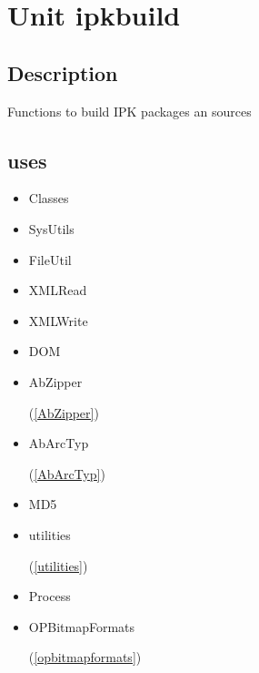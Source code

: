 \documentclass{report}
\begin{document}
\chapter{Unit ipkbuild}
\label{ipkbuild}
\section{Description}
Functions to build IPK packages an sources
\section{uses}
\begin{itemize}
\item \begin{ttfamily}Classes\end{ttfamily}\item \begin{ttfamily}SysUtils\end{ttfamily}\item \begin{ttfamily}FileUtil\end{ttfamily}\item \begin{ttfamily}XMLRead\end{ttfamily}\item \begin{ttfamily}XMLWrite\end{ttfamily}\item \begin{ttfamily}DOM\end{ttfamily}\item \begin{ttfamily}AbZipper\end{ttfamily}(\ref{AbZipper})\item \begin{ttfamily}AbArcTyp\end{ttfamily}(\ref{AbArcTyp})\item \begin{ttfamily}MD5\end{ttfamily}\item \begin{ttfamily}utilities\end{ttfamily}(\ref{utilities})\item \begin{ttfamily}Process\end{ttfamily}\item \begin{ttfamily}OPBitmapFormats\end{ttfamily}(\ref{opbitmapformats})\end{itemize}
\end{document}
